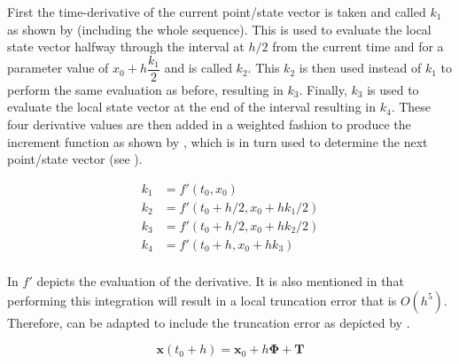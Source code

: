 First the time-derivative of the current point/state vector is taken and called $k_{1}$ as shown by  (including the whole sequence). This is used to evaluate the local state vector halfway through the interval at $h/2$ from the current time and for a parameter value of $x_{0}+h\dfrac{k_{1}}{2}$ and is called $k_{2}$. This $k_{2}$ is then used instead of $k_{1}$ to perform the same evaluation as before, resulting in $k_{3}$. Finally, $k_{3}$ is used to evaluate the local state vector at the end of the interval resulting in $k_{4}$. These four derivative values are then added in a weighted fashion to produce the increment function as shown by , which is in turn used to determine the next point/state vector (see ). 


\begin{equation} \label{eq:k}
\begin{split}
k_{1}&=f'\left(t_{0},x_{0}\right)\\
k_{2}&=f'\left(t_{0}+h/2,x_{0}+hk_{1}/2\right)\\
k_{3}&=f'\left(t_{0}+h/2,x_{0}+hk_{2}/2\right)\\
k_{4}&=f'\left(t_{0}+h,x_{0}+hk_{3}\right)\\
\end{split}
\end{equation}

In  $f'$ depicts the evaluation of the derivative. It is also mentioned in \cite{noomen2013int} that performing this integration will result in a local truncation error that is $O\left(h^{5}\right)$. Therefore,  can be adapted to include the truncation error as depicted by .



\begin{equation} \label{eq:trunc_int}
\mathbf{x}(t_{0}+h)=\mathbf{x}_{0}+h\bm{\Phi}+\mathbf{T}
\end{equation}


